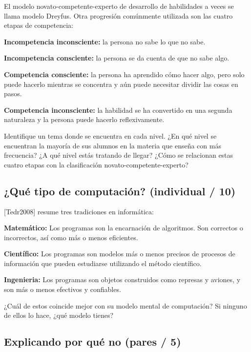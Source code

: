 \documentclass[
]{book}
\begin{document}
El modelo novato-competente-experto de desarrollo de habilidades a veces se llama modelo Dreyfus. Otra progresión comúnmente utilizada son las cuatro etapas de competencia:

\textbf{Incompetencia inconsciente:}
la persona no sabe lo que no sabe.

\textbf{Incompetencia consciente:}
la persona se da cuenta de que no sabe algo.

\textbf{Competencia consciente:}
la persona ha aprendido cómo hacer algo, pero solo puede hacerlo mientras se concentra y aún puede necesitar dividir las cosas en pasos.

\textbf{Competencia inconsciente:}
la habilidad se ha convertido en una segunda naturaleza y la persona puede hacerlo reflexivamente.

Identifique un tema donde se encuentra en cada nivel. ¿En qué nivel se encuentran la mayoría de sus alumnos en la materia que enseña con más frecuencia? ¿A qué nivel estás tratando de llegar? ¿Cómo se relacionan estas cuatro etapas con la clasificación novato-competente-experto?

\hypertarget{quuxe9-tipo-de-computaciuxf3n-individual-10}{%
\subsection{¿Qué tipo de computación? (individual / 10)}\label{quuxe9-tipo-de-computaciuxf3n-individual-10}}

{[}Tedr2008{]} resume tres tradiciones en informática:

\textbf{Matemático:}
Los programas son la encarnación de algoritmos. Son correctos o incorrectos, así como más o menos eficientes.

\textbf{Científico:}
Los programas son modelos más o menos precisos de procesos de información que pueden estudiarse utilizando el método científico.

\textbf{Ingenieria:}
Los programas son objetos construidos como represas y aviones, y son más o menos efectivos y confiables.

¿Cuál de estos coincide mejor con su modelo mental de computación? Si ninguno de ellos lo hace, ¿qué modelo tienes?

\hypertarget{explicando-por-quuxe9-no-pares-5}{%
\subsection{Explicando por qué no (pares / 5)}\label{explicando-por-quuxe9-no-pares-5}}
\end{document}
